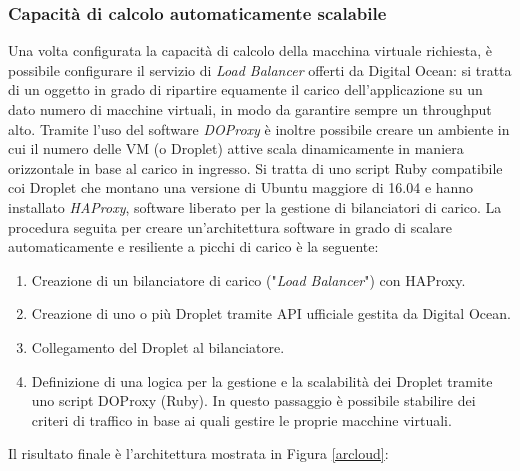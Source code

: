 \subsubsection{Capacità di calcolo automaticamente scalabile} \label{loadb}
Una volta configurata la capacità di calcolo della macchina virtuale richiesta, è possibile configurare il servizio di \textit{Load Balancer} offerti da Digital Ocean: si tratta di un oggetto in grado di ripartire equamente il carico dell'applicazione su un dato numero di macchine virtuali, in modo da garantire sempre un throughput alto. Tramite l'uso del software \textit{DOProxy} è inoltre possibile creare un ambiente in cui il numero delle VM (o Droplet) attive scala dinamicamente in maniera orizzontale in base al carico in ingresso. Si tratta di uno script Ruby compatibile coi Droplet che montano una versione di Ubuntu maggiore di 16.04 e hanno installato \textit{HAProxy}, software liberato per la gestione di bilanciatori di carico. %
La procedura seguita per creare un'architettura software in grado di scalare automaticamente e resiliente a picchi di carico è la seguente: 
\begin{enumerate}
\item Creazione di un bilanciatore di carico ("\emph{Load Balancer}") con HAProxy. 
\item Creazione di uno o più Droplet tramite API ufficiale gestita da Digital Ocean.
\item Collegamento del Droplet al bilanciatore.
\item Definizione di una logica per la gestione e la scalabilità dei Droplet tramite uno script DOProxy (Ruby). In questo passaggio è possibile stabilire dei criteri di traffico in base ai quali gestire le proprie macchine virtuali. 
\end{enumerate}
Il risultato finale è l'architettura mostrata in Figura \ref{arcloud}: 
